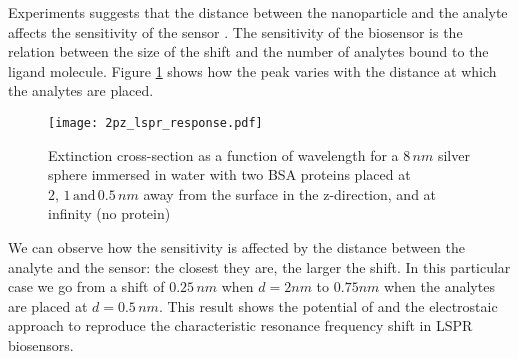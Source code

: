Experiments suggests that the distance between the nanoparticle and the analyte 
affects the sensitivity of the sensor \cite{HaesETal2004}. The sensitivity of 
the biosensor is the relation between the size of the shift and the number of 
analytes bound to the ligand molecule. Figure \ref{fig:dist_response} shows how
the peak varies with the distance at which the analytes are placed.  


\begin{figure}[h] %
   \centering
   \texttt{[image: 2pz\_lspr\_response.pdf]} 
   \caption{Extinction cross-section as a function of wavelength for a $8 \, nm$
            silver sphere immersed in water with two BSA proteins placed at
            $2, \, 1 \, \text{and} \, 0.5 \, nm$ away from the surface in the 
            z-direction, and at infinity (no protein)}
   \label{fig:dist_response}
\end{figure}

We can observe how the sensitivity is affected by the distance between the 
analyte and the sensor: the closest they are, the larger the shift. In this particular
case we go from a shift of $0.25 \, nm$ when $d=2 nm$ to $0.75 nm$ when the 
analytes are placed at $d=0.5 \, nm$. This result shows the potential of \pygbe 
and the electrostaic approach to reproduce the characteristic resonance frequency
shift in LSPR biosensors.



